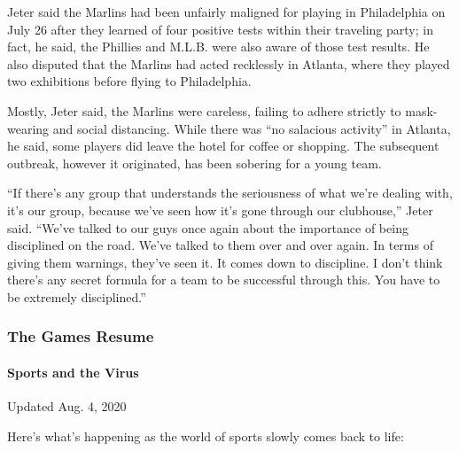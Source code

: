 Jeter said the Marlins had been unfairly maligned for playing in
Philadelphia on July 26 after they learned of four positive tests within
their traveling party; in fact, he said, the Phillies and M.L.B. were
also aware of those test results. He also disputed that the Marlins had
acted recklessly in Atlanta, where they played two exhibitions before
flying to Philadelphia.

Mostly, Jeter said, the Marlins were careless, failing to adhere
strictly to mask-wearing and social distancing. While there was ``no
salacious activity'' in Atlanta, he said, some players did leave the
hotel for coffee or shopping. The subsequent outbreak, however it
originated, has been sobering for a young team.

``If there's any group that understands the seriousness of what we're
dealing with, it's our group, because we've seen how it's gone through
our clubhouse,'' Jeter said. ``We've talked to our guys once again about
the importance of being disciplined on the road. We've talked to them
over and over again. In terms of giving them warnings, they've seen it.
It comes down to discipline. I don't think there's any secret formula
for a team to be successful through this. You have to be extremely
disciplined.''

\hypertarget{the-games-resume}{%
\subsubsection{The Games Resume}\label{the-games-resume}}

\hypertarget{sports-and-the-virus}{%
\paragraph{Sports and the Virus}\label{sports-and-the-virus}}

Updated Aug. 4, 2020

Here's what's happening as the world of sports slowly comes back to
life:

